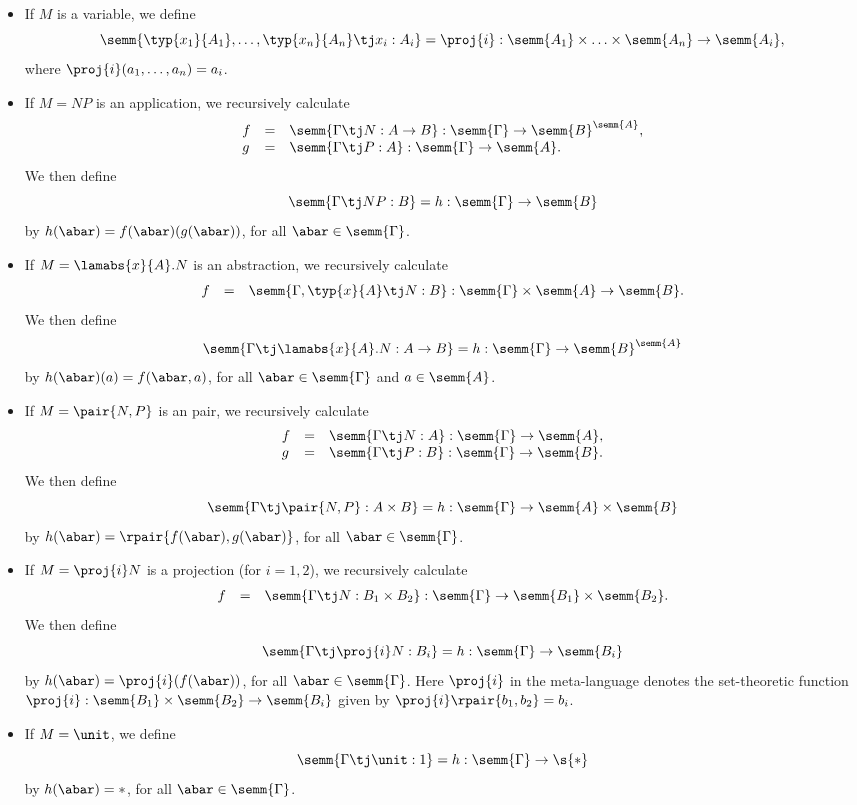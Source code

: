 \documentclass[12pt]{article}
\begin{document}
\begin{itemize}
\item If $M$ is a variable, we define 
  \[ \semm{\typ{x_1}{A_1},\ldots,\typ{x_n}{A_n}\tj x_i:A_i} = \proj{i}
  : \semm{A_1}\times\ldots\times\semm{A_n}\to\semm{A_i},
  \]
  where $\proj{i}(a_1,\ldots,a_n) = a_i$.
\item If $M=NP$ is an application, we recursively calculate
  \[ \begin{array}{lll}
    f &=& \semm{\Gamma\tj N:A\to B}
    : \semm{\Gamma}\to\semm{B}^{\semm{A}}, \\
    g &=& \semm{\Gamma\tj P:A} : \semm{\Gamma}\to\semm{A}.
  \end{array}
  \]
  We then define
  \[ \semm{\Gamma\tj NP:B} = h : \semm{\Gamma}\to\semm{B}
  \]
  by $h(\abar)=f(\abar)(g(\abar))$, for all $\abar\in\semm{\Gamma}$.
\item If $M=\lamabs{x}{A}.N$ is an abstraction, we recursively calculate
  \[ \begin{array}{lll}
    f &=& \semm{\Gamma,\typ{x}{A}\tj N:B}
    : \semm{\Gamma}\times\semm{A}\to\semm{B}.
  \end{array}
  \]
  We then define
  \[ \semm{\Gamma\tj\lamabs{x}{A}.N:A\to B} = h 
  : \semm{\Gamma}\to\semm{B}^{\semm{A}}
  \]
  by $h(\abar)(a) = f(\abar,a)$, for all $\abar\in\semm{\Gamma}$ and
  $a\in\semm{A}$.
\item If $M=\pair{N,P}$ is an pair, we recursively calculate
  \[ \begin{array}{lll}
    f &=& \semm{\Gamma\tj N:A} : \semm{\Gamma}\to\semm{A}, \\
    g &=& \semm{\Gamma\tj P:B} : \semm{\Gamma}\to\semm{B}.
  \end{array}
  \]
  We then define
  \[ \semm{\Gamma\tj \pair{N,P}:A\times B} = h 
  : \semm{\Gamma}\to\semm{A}\times\semm{B}
  \]
  by $h(\abar)=\rpair{f(\abar),g(\abar)}$, for all $\abar\in\semm{\Gamma}$.
\item If $M=\proj{i}N$ is a projection (for $i=1,2$), we recursively
  calculate
  \[ \begin{array}{lll}
    f &=& \semm{\Gamma\tj N:B_1\times B_2} 
    : \semm{\Gamma}\to\semm{B_1}\times\semm{B_2}.
  \end{array}
  \]
  We then define
  \[ \semm{\Gamma\tj \proj{i}N:B_i} = h 
  : \semm{\Gamma}\to\semm{B_i}
  \]
  by $h(\abar)=\proj{i}(f(\abar))$, for all $\abar\in\semm{\Gamma}$.
  Here $\proj{i}$ in the meta-language denotes the set-theoretic
  function $\proj{i}:\semm{B_1}\times\semm{B_2}\to\semm{B_i}$ given by
  $\proj{i}\rpair{b_1,b_2} = b_i$.
\item If $M=\unit$, we define
  \[ \semm{\Gamma\tj\unit:1} = h : \semm{\Gamma}\to\s{*}
  \]
  by $h(\abar)=*$, for all $\abar\in\semm{\Gamma}$.
\end{itemize}
\end{document}
